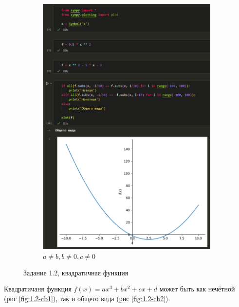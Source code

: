 \documentclass[14pt,a4paper]{extarticle}
\begin{document}
\begin{figure}[!ht]
\begin{subfigure}{.5\textwidth}
        \includegraphics[width=0.9\linewidth]{figures/1.2-sq2.png}
        \caption{$a\neq b, b\neq 0,c\neq 0$}
        \label{fig:1.2-sq2}
    \end{subfigure}
    \caption{Задание 1.2, квадратичная функция}
    \label{fig:1.2-sq}
\end{figure}

Квадратичаня функция $f(x)=ax^3+bx^2+cx+d$ может быть как нечётной (рис \ref{fig:1.2-cb1}),
так и общего вида (рис \ref{fig:1.2-cb2}).
\newpage
\end{document}
